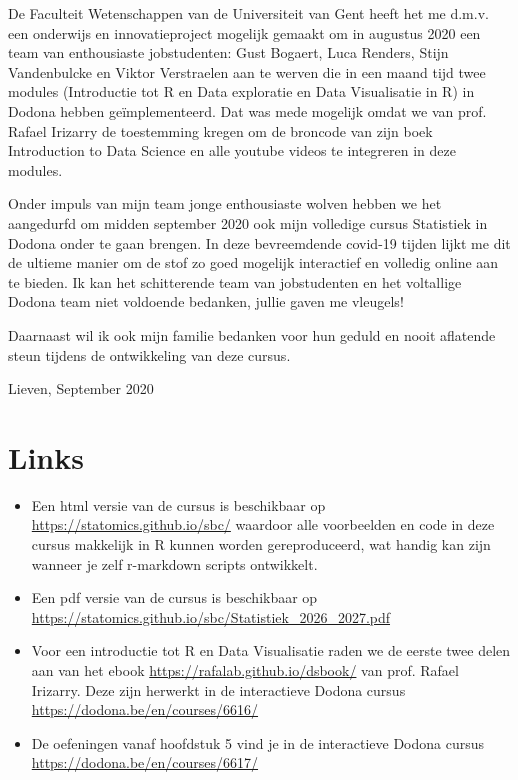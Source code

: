 \documentclass[
  dutch,
  letterpaper,
  12pt]{book}
\theoremstyle{definition}
\theoremstyle{definition}
\theoremstyle{definition}
\theoremstyle{remark}
\begin{document}
De Faculteit Wetenschappen van de Universiteit van Gent heeft het me
d.m.v. een onderwijs en innovatieproject mogelijk gemaakt om in augustus
2020 een team van enthousiaste jobstudenten: Gust Bogaert, Luca Renders,
Stijn Vandenbulcke en Viktor Verstraelen aan te werven die in een maand
tijd twee modules (Introductie tot R en Data exploratie en Data
Visualisatie in R) in Dodona hebben geïmplementeerd. Dat was mede
mogelijk omdat we van prof. Rafael Irizarry de toestemming kregen om de
broncode van zijn boek Introduction to Data Science en alle youtube
videos te integreren in deze modules.

Onder impuls van mijn team jonge enthousiaste wolven hebben we het
aangedurfd om midden september 2020 ook mijn volledige cursus Statistiek
in Dodona onder te gaan brengen. In deze bevreemdende covid-19 tijden
lijkt me dit de ultieme manier om de stof zo goed mogelijk interactief
en volledig online aan te bieden. Ik kan het schitterende team van
jobstudenten en het voltallige Dodona team niet voldoende bedanken,
jullie gaven me vleugels!

Daarnaast wil ik ook mijn familie bedanken voor hun geduld en nooit
aflatende steun tijdens de ontwikkeling van deze cursus.

Lieven, September 2020


\chapter*{Links}\label{links}


\begin{itemize}
\item
  Een html versie van de cursus is beschikbaar op
  \url{https://statomics.github.io/sbc/} waardoor alle voorbeelden en
  code in deze cursus makkelijk in R kunnen worden gereproduceerd, wat
  handig kan zijn wanneer je zelf r-markdown scripts ontwikkelt.
\item
  Een pdf versie van de cursus is beschikbaar op
  \url{https://statomics.github.io/sbc/Statistiek_2026_2027.pdf}
\item
  Voor een introductie tot R en Data Visualisatie raden we de eerste
  twee delen aan van het ebook \url{https://rafalab.github.io/dsbook/}
  van prof. Rafael Irizarry. Deze zijn herwerkt in de interactieve
  Dodona cursus \url{https://dodona.be/en/courses/6616/}
\item
  De oefeningen vanaf hoofdstuk 5 vind je in de interactieve Dodona
  cursus \url{https://dodona.be/en/courses/6617/}
\end{itemize}
\end{document}
